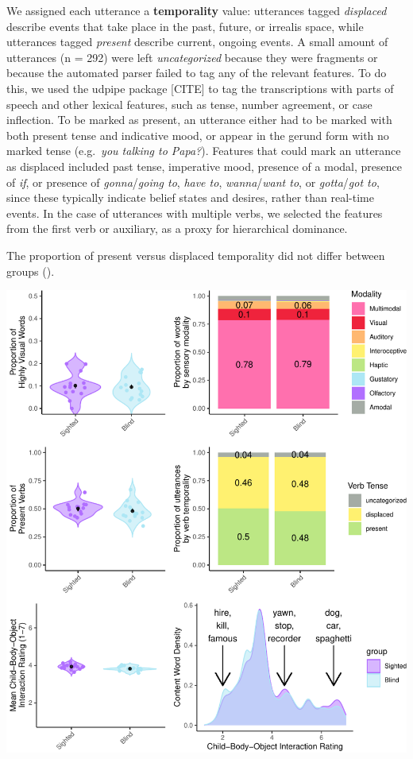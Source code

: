 \documentclass[
  man]{apa6}
\begin{document}
We assigned each utterance a \textbf{temporality} value: utterances tagged \emph{displaced} describe events that take place in the past, future, or irrealis space, while utterances tagged \emph{present} describe current, ongoing events. A small amount of utterances (n = 292) were left \emph{uncategorized} because they were fragments or because the automated parser failed to tag any of the relevant features. To do this, we used the udpipe package {[}CITE{]} to tag the transcriptions with parts of speech and other lexical features, such as tense, number agreement, or case inflection. To be marked as present, an utterance either had to be marked with both present tense and indicative mood, or appear in the gerund form with no marked tense (e.g.~\emph{you talking to Papa?}). Features that could mark an utterance as displaced included past tense, imperative mood, presence of a modal, presence of \emph{if}, or presence of \emph{gonna}/\emph{going to}, \emph{have to}, \emph{wanna}/\emph{want to}, or \emph{gotta}/\emph{got to}, since these typically indicate belief states and desires, rather than real-time events. In the case of utterances with multiple verbs, we selected the features from the first verb or auxiliary, as a proxy for hierarchical dominance.

The proportion of present versus displaced temporality did not differ between groups ().

\includegraphics{input_quality_manuscript_files/figure-latex/conceptual-plots-1.pdf}
\end{document}
